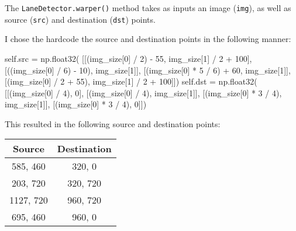 \documentclass[11pt]{article}
\newenvironment{Shaded}{}{}
\newcommand{\DecValTok}[1]{\textcolor[rgb]{0.25,0.63,0.44}{{#1}}}
\newcommand{\NormalTok}[1]{{#1}}
\newcommand{\VariableTok}[1]{\textcolor[rgb]{0.10,0.09,0.49}{{#1}}}
\newcommand{\OperatorTok}[1]{\textcolor[rgb]{0.40,0.40,0.40}{{#1}}}
\begin{document}
The \texttt{LaneDetector.warper()} method takes as inputs an image
(\texttt{img}), as well as source (\texttt{src}) and destination
(\texttt{dst}) points.

I chose the hardcode the source and destination points in the following
manner:

\begin{Shaded}
\begin{Highlighting}[]
\VariableTok{self}\NormalTok{.src }\OperatorTok{=}\NormalTok{ np.float32(}
\NormalTok{    [[(img_size[}\DecValTok{0}\NormalTok{] }\OperatorTok{/} \DecValTok{2}\NormalTok{) }\OperatorTok{-} \DecValTok{55}\NormalTok{, img_size[}\DecValTok{1}\NormalTok{] }\OperatorTok{/} \DecValTok{2} \OperatorTok{+} \DecValTok{100}\NormalTok{],}
\NormalTok{    [((img_size[}\DecValTok{0}\NormalTok{] }\OperatorTok{/} \DecValTok{6}\NormalTok{) }\OperatorTok{-} \DecValTok{10}\NormalTok{), img_size[}\DecValTok{1}\NormalTok{]],}
\NormalTok{    [(img_size[}\DecValTok{0}\NormalTok{] }\OperatorTok{*} \DecValTok{5} \OperatorTok{/} \DecValTok{6}\NormalTok{) }\OperatorTok{+} \DecValTok{60}\NormalTok{, img_size[}\DecValTok{1}\NormalTok{]],}
\NormalTok{    [(img_size[}\DecValTok{0}\NormalTok{] }\OperatorTok{/} \DecValTok{2} \OperatorTok{+} \DecValTok{55}\NormalTok{), img_size[}\DecValTok{1}\NormalTok{] }\OperatorTok{/} \DecValTok{2} \OperatorTok{+} \DecValTok{100}\NormalTok{]])}
\VariableTok{self}\NormalTok{.dst }\OperatorTok{=}\NormalTok{ np.float32(}
\NormalTok{    [[(img_size[}\DecValTok{0}\NormalTok{] }\OperatorTok{/} \DecValTok{4}\NormalTok{), }\DecValTok{0}\NormalTok{],}
\NormalTok{    [(img_size[}\DecValTok{0}\NormalTok{] }\OperatorTok{/} \DecValTok{4}\NormalTok{), img_size[}\DecValTok{1}\NormalTok{]],}
\NormalTok{    [(img_size[}\DecValTok{0}\NormalTok{] }\OperatorTok{*} \DecValTok{3} \OperatorTok{/} \DecValTok{4}\NormalTok{), img_size[}\DecValTok{1}\NormalTok{]],}
\NormalTok{    [(img_size[}\DecValTok{0}\NormalTok{] }\OperatorTok{*} \DecValTok{3} \OperatorTok{/} \DecValTok{4}\NormalTok{), }\DecValTok{0}\NormalTok{]])}
\end{Highlighting}
\end{Shaded}

This resulted in the following source and destination points:

\begin{longtable}[]{@{}cc@{}}
\toprule
Source & Destination\tabularnewline
\midrule
\endhead
585, 460 & 320, 0\tabularnewline
203, 720 & 320, 720\tabularnewline
1127, 720 & 960, 720\tabularnewline
695, 460 & 960, 0\tabularnewline
\bottomrule
\end{longtable}
\end{document}
